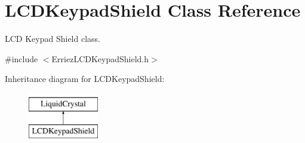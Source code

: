 \hypertarget{class_l_c_d_keypad_shield}{}\section{L\+C\+D\+Keypad\+Shield Class Reference}
\label{class_l_c_d_keypad_shield}


L\+CD Keypad Shield class.  




{\ttfamily \#include $<$Erriez\+L\+C\+D\+Keypad\+Shield.\+h$>$}

Inheritance diagram for L\+C\+D\+Keypad\+Shield\+:\begin{figure}[H]
\begin{center}
\leavevmode
\includegraphics[height=2.000000cm]{class_l_c_d_keypad_shield}
\end{center}
\end{figure}
